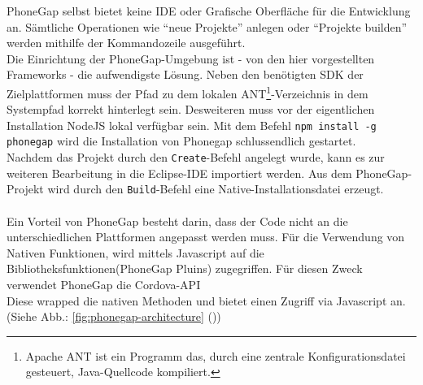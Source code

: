 \documentclass[../Bachelorarbeit.tex]{subfiles}
\begin{document}

PhoneGap selbst bietet keine \ac{IDE} oder Grafische Oberfläche für die Entwicklung an. 
Sämtliche Operationen wie "`neue Projekte"' anlegen oder "`Projekte builden"' werden mithilfe der Kommandozeile ausgeführt. \\
Die Einrichtung der PhoneGap-Umgebung ist - von den hier vorgestellten Frameworks - die aufwendigste Lösung. 
Neben den benötigten \ac{SDK} der Zielplattformen muss der Pfad zu dem lokalen ANT\footnote{Apache ANT ist ein Programm das, durch eine zentrale Konfigurationsdatei gesteuert, Java-Quellcode kompiliert\parencite[Mehr Informationen finden Sie unter: ][]{ant_homepage}. }-Verzeichnis in dem Systempfad korrekt hinterlegt sein. 
Desweiteren muss vor der eigentlichen Installation NodeJS lokal verfügbar sein.
Mit dem Befehl \texttt{npm install -g phonegap} wird die Installation von Phonegap schlussendlich gestartet.\\

Nachdem das Projekt durch den \texttt{Create}-Befehl angelegt wurde, kann es zur 
weiteren Bearbeitung in die Eclipse-\ac{IDE} importiert werden.
Aus dem PhoneGap-Projekt wird durch den \texttt{Build}-Befehl eine Native-Installationsdatei erzeugt.
\\
\\
Ein Vorteil von PhoneGap besteht darin, dass der Code nicht an die unterschiedlichen Plattformen angepasst werden muss. 
Für die Verwendung von Nativen Funktionen, wird mittels Javascript auf die Bibliotheksfunktionen(PhoneGap Pluins) zugegriffen. 
Für diesen Zweck verwendet PhoneGap die Cordova-\ac{API} \parencites(vgl.)()[Seite 2, sowie]{phonegap_cookbook}[Abschnitt: PhoneGap oder Apache Cordova]{phonegapArtikel_heiseDev}\\
Diese wrapped die nativen Methoden und bietet einen Zugriff via Javascript an.(Siehe Abb.: \ref{fig:phonegap-architecture} ())
\end{document}
